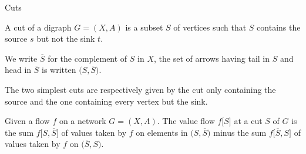 \documentclass[32pt, aspectratio=169]{beamer}
\begin{document}
\begin{frame}{Cuts}
  \begin{defn}[of a cut]
    A cut of a digraph $G=(X, A)$ is a subset $S$ of vertices such that $S$
    contains the source $s$ but not the sink $t$.
  \end{defn}
  \pause
  We write $\overline{S}$ for the complement of $S$ in $X$, the set
  of arrows having tail in $S$ and head in $\overline{S}$ is written
  $\big(S, \overline{S} \big)$.
  \begin{rem}
    The two simplest cuts are respectively given by the cut only
    containing the source and the one containing every vertex but the sink.
  \end{rem}
  \pause
  \begin{defn}
    Given a flow $f$ on a network $G= (X, A)$. The value flow
    $f\big[S\big]$ at a cut $S$ of $G$ is the sum
    $f\big[S, \overline{S} \big]$ of values taken by $f$ on elements in
    $\big(S, \overline{S}\big)$ minus the sum $f\big[\overline{S}, S\big]$
    of values taken by $f$ on $\big(\overline{S}, S\big)$.
  \end{defn}
\end{frame}
\end{document}
